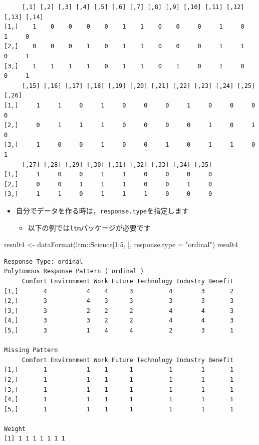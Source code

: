 \documentclass[
  a4paper,
]{ltjsbook}
\newenvironment{Shaded}{\begin{snugshade}}{\end{snugshade}}
\newcommand{\AttributeTok}[1]{\textcolor[rgb]{0.40,0.45,0.13}{#1}}
\newcommand{\DecValTok}[1]{\textcolor[rgb]{0.68,0.00,0.00}{#1}}
\newcommand{\FunctionTok}[1]{\textcolor[rgb]{0.28,0.35,0.67}{#1}}
\newcommand{\NormalTok}[1]{\textcolor[rgb]{0.00,0.23,0.31}{#1}}
\newcommand{\OtherTok}[1]{\textcolor[rgb]{0.00,0.23,0.31}{#1}}
\newcommand{\SpecialCharTok}[1]{\textcolor[rgb]{0.37,0.37,0.37}{#1}}
\newcommand{\StringTok}[1]{\textcolor[rgb]{0.13,0.47,0.30}{#1}}
\providecommand{\tightlist}{%
  \setlength{\itemsep}{0pt}\setlength{\parskip}{0pt}}\usepackage{longtable,booktabs,array}
\begin{document}
\begin{verbatim}
     [,1] [,2] [,3] [,4] [,5] [,6] [,7] [,8] [,9] [,10] [,11] [,12] [,13] [,14]
[1,]    1    0    0    0    0    1    1    0    0     0     1     0     1     0
[2,]    0    0    0    1    0    1    1    0    0     0     1     1     0     1
[3,]    1    1    1    1    0    1    1    0    1     0     1     0     0     1
     [,15] [,16] [,17] [,18] [,19] [,20] [,21] [,22] [,23] [,24] [,25] [,26]
[1,]     1     1     0     1     0     0     0     1     0     0     0     0
[2,]     0     1     1     1     0     0     0     0     1     0     1     0
[3,]     1     0     0     1     0     0     1     0     1     1     0     1
     [,27] [,28] [,29] [,30] [,31] [,32] [,33] [,34] [,35]
[1,]     1     0     0     1     1     0     0     0     0
[2,]     0     0     1     1     1     0     0     1     0
[3,]     1     1     0     1     1     1     0     0     0
\end{verbatim}

\begin{itemize}
\tightlist
\item
  自分でデータを作る時は，\texttt{response.type}を指定します

  \begin{itemize}
  \tightlist
  \item
    以下の例では\texttt{ltm}パッケージが必要です
  \end{itemize}
\end{itemize}

\begin{Shaded}
\begin{Highlighting}[]
\NormalTok{result4 }\OtherTok{\textless{}{-}} \FunctionTok{dataFormat}\NormalTok{(ltm}\SpecialCharTok{::}\NormalTok{Science[}\DecValTok{1}\SpecialCharTok{:}\DecValTok{5}\NormalTok{, ], }\AttributeTok{response.type =} \StringTok{"ordinal"}\NormalTok{)}
\NormalTok{result4}
\end{Highlighting}
\end{Shaded}

\begin{verbatim}
Response Type: ordinal 
Polytomous Response Pattern ( ordinal )
     Comfort Environment Work Future Technology Industry Benefit
[1,]       4           4    4      3          4        3       2
[2,]       3           4    3      3          3        3       3
[3,]       3           2    2      2          4        4       3
[4,]       3           3    2      2          4        4       3
[5,]       3           1    4      4          2        3       1

Missing Pattern
     Comfort Environment Work Future Technology Industry Benefit
[1,]       1           1    1      1          1        1       1
[2,]       1           1    1      1          1        1       1
[3,]       1           1    1      1          1        1       1
[4,]       1           1    1      1          1        1       1
[5,]       1           1    1      1          1        1       1

Weight
[1] 1 1 1 1 1 1 1
\end{verbatim}
\end{document}
